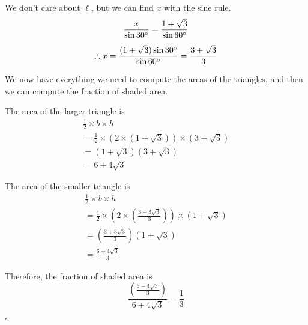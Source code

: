 \documentclass[a4paper]{article}
\begin{document}
We don't care about $\ell$, but we can find $x$ with the sine rule.
\begin{gather*}
\frac{x}{\sin 30\degree} = \frac{1 + \sqrt{3}}{\sin 60\degree}\\[0.5em]
\therefore x = \frac{(1 + \sqrt{3}) \sin 30\degree}{\sin 60\degree} = \frac{3 + \sqrt{3}}{3}
\end{gather*}

We now have everything we need to compute the areas of the triangles, and then we can compute the fraction of shaded area.

The area of the larger triangle is
\begin{gather*}
\frac{1}{2} \times b \times h\\[0.5em]
= \frac{1}{2} \times (2 \times (1 + \sqrt{3})) \times (3 + \sqrt{3})\\[0.5em]
= (1 + \sqrt{3})(3 + \sqrt{3})\\[0.5em]
= 6 + 4\sqrt{3}
\end{gather*}

The area of the smaller triangle is
\begin{gather*}
\frac{1}{2} \times b \times h\\[0.5em]
= \frac{1}{2} \times \left(2 \times \left(\frac{3 + 3\sqrt{3}}{3}\right)\right) \times (1 + \sqrt{3})\\[0.5em]
= \left(\frac{3 + 3\sqrt{3}}{3}\right)(1 + \sqrt{3})\\[0.5em]
= \frac{6 + 4\sqrt{3}}{3}
\end{gather*}

Therefore, the fraction of shaded area is $$\frac{\left(\frac{6 + 4\sqrt{3}}{3}\right)}{6 + 4\sqrt{3}} = \frac{1}{3}$$

\hspace{\fill}$\square$
\end{document}
